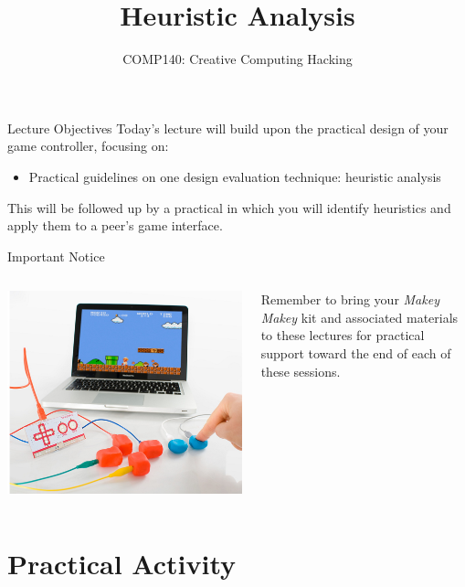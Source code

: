 \documentclass[xcolor={dvipsnames}]{beamer}\usepackage{etoolbox}\newtoggle{printable}\togglefalse{printable}
\begin{document}
\title{Heuristic Analysis}   
\subtitle{COMP140: Creative Computing Hacking}

\frame{\titlepage} 

\begin{frame}{Lecture Objectives}
	Today's lecture will build upon the practical design of your game controller, focusing on:
	
	\begin{itemize}
		\item Practical guidelines on one design evaluation technique: heuristic analysis
	\end{itemize}
	
	This will be followed up by a practical in which you will identify heuristics and apply them to a peer's game interface.
\end{frame}

\begin{frame}{Important Notice}
	\begin{columns}[onlytextwidth]
		\begin{column}{0.45\textwidth}
			\includegraphics[height=22ex]{MakeyMakey.jpg}
		\end{column}
		\begin{column}{0.45\textwidth}
			Remember to bring your \textit{Makey Makey} kit and associated materials to these lectures for practical 
			support toward the end of each of these sessions.
		\end{column}
	\end{columns}
\end{frame}

%

%



%

\part{Practical Activity}
\frame{\partpage}
\end{document}
